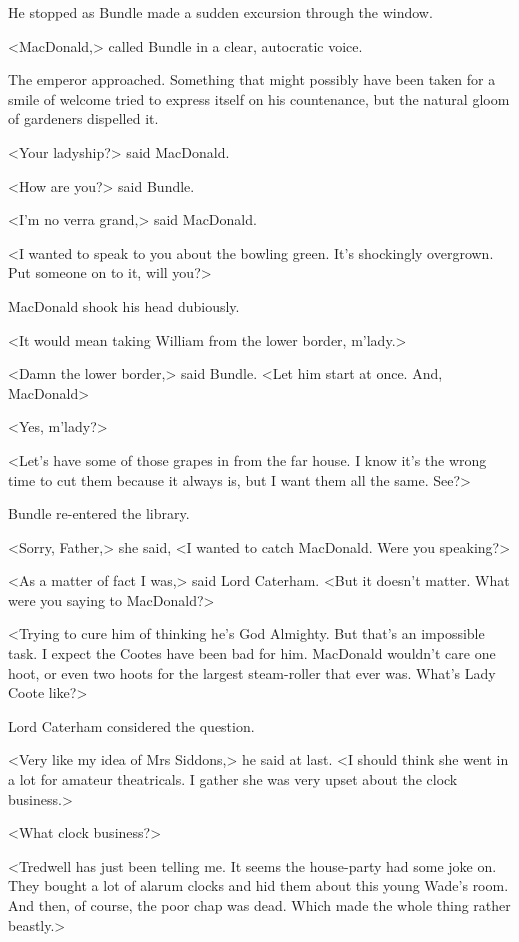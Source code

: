 He stopped as Bundle made a sudden excursion through the window.

<MacDonald,> called Bundle in a clear, autocratic voice.

The emperor approached. Something that might possibly have been taken for a smile of welcome tried to express itself on his countenance, but the natural gloom of gardeners dispelled it.

<Your ladyship?> said MacDonald.

<How are you?> said Bundle.

<I'm no verra grand,> said MacDonald.

<I wanted to speak to you about the bowling green. It's shockingly overgrown. Put someone on to it, will you?>

MacDonald shook his head dubiously.

<It would mean taking William from the lower border, m'lady.>

<Damn the lower border,> said Bundle. <Let him start at once. And, MacDonald\longdash>

<Yes, m'lady?>

<Let's have some of those grapes in from the far house. I know it's the wrong time to cut them because it always is, but I want them all the same. See?>

Bundle re-entered the library.

<Sorry, Father,> she said, <I wanted to catch MacDonald. Were you speaking?>

<As a matter of fact I was,> said Lord Caterham. <But it doesn't matter. What were you saying to MacDonald?>

<Trying to cure him of thinking he's God Almighty. But that's an impossible task. I expect the Cootes have been bad for him. MacDonald wouldn't care one hoot, or even two hoots for the largest steam-roller that ever was. What's Lady Coote like?>

Lord Caterham considered the question.

<Very like my idea of Mrs Siddons,> he said at last. <I should think she went in a lot for amateur theatricals. I gather she was very upset about the clock business.>

<What clock business?>

<Tredwell has just been telling me. It seems the house-party had some joke on. They bought a lot of alarum clocks and hid them about this young Wade's room. And then, of course, the poor chap was dead. Which made the whole thing rather beastly.>

